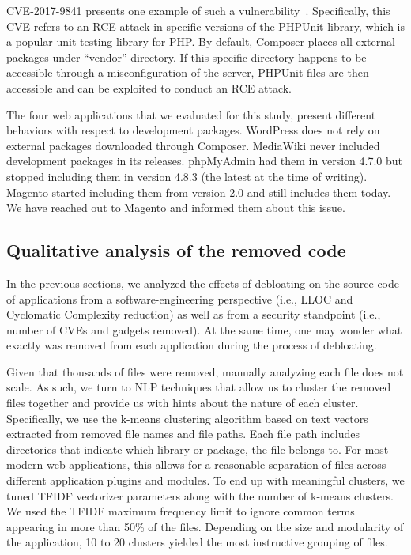 CVE-2017-9841 presents one example of such a
vulnerability~\cite{phpunitVulnerability}. Specifically, this CVE refers
to an RCE attack in specific versions of the PHPUnit library, which is
a popular unit testing library for PHP. By default, Composer places all
external packages under ``vendor'' directory. If this specific directory
happens to be accessible through a misconfiguration of the server, PHPUnit
files are then accessible and can be exploited to conduct an RCE attack.

The four web applications that we evaluated for this study, present
different behaviors with respect to development packages. WordPress does not rely on external packages downloaded through Composer.
MediaWiki never
included development packages in its releases. phpMyAdmin had them in version
4.7.0 but stopped including them in version 4.8.3 (the latest at the time of
writing). Magento started including them from version 2.0 and still includes
them today. We have reached out to Magento and informed them about this issue.


\subsection{Qualitative analysis of the removed code}
\label{subsec:qualitative}

In the previous sections, we analyzed the effects of debloating on the source code of applications from a software-engineering perspective (i.e., LLOC and Cyclomatic Complexity reduction) as well as from a security standpoint (i.e., number of CVEs and gadgets removed). At the same time, one may wonder what exactly was removed from each application during the process of debloating.



Given that thousands of files were removed, manually analyzing each file does not scale. As such, we turn to NLP techniques that allow us to cluster the removed files together and provide us with hints about the nature of each cluster. Specifically, we use the k-means clustering algorithm based on text vectors extracted from removed file names and file paths. Each file path includes directories that indicate which library or package, the file belongs to. For most modern web applications, this allows for a reasonable separation of files across different application plugins and modules.
To end up with meaningful clusters, we tuned TFIDF vectorizer parameters along with the number of k-means clusters. We used the TFIDF maximum frequency limit to ignore common terms appearing in more than 50\% of the files. Depending on the size and modularity of the application, 10 to 20 clusters yielded the most instructive grouping of files.

